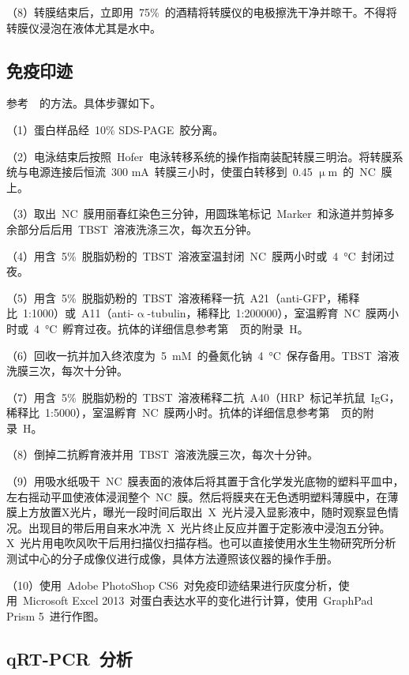 （8）转膜结束后，立即用\ 75\%\ 的酒精将转膜仪的电极擦洗干净并晾干。不得将转膜仪浸泡在液体尤其是水中。

\subsection{免疫印迹}\label{subsec:western}
参考\ \citet{Hu2014}\ 的方法。具体步骤如下。

（1）蛋白样品经\ 10\% SDS-PAGE\ 胶分离。

（2）电泳结束后按照\ Hofer\ 电泳转移系统的操作指南装配转膜三明治。将转膜系统与电源连接后恒流\ 300 mA\ 转膜三小时，使蛋白转移到\ 0.45 $\upmu$m\ 的\ NC\ 膜上。

（3）取出\ NC\ 膜用丽春红染色三分钟，用圆珠笔标记\ Marker\ 和泳道并剪掉多余部分后后用\ TBST\ 溶液洗涤三次，每次五分钟。

（4）用含\ 5\%\ 脱脂奶粉的\ TBST\ 溶液室温封闭\ NC\ 膜两小时或\ \SI{4}{\degreeCelsius}\ 封闭过夜。

（5）用含\ 5\%\ 脱脂奶粉的\ TBST\ 溶液稀释一抗\ A21（anti-GFP，稀释比\ 1:1000）或\ A11（anti-$\upalpha$-tubulin，稀释比\ 1:200000），室温孵育\ NC\ 膜两小时或\ \SI{4}{\degreeCelsius}\ 孵育过夜。抗体的详细信息参考第\
\pageref{appen:H}\ 页的附录\ H。

（6）回收一抗并加入终浓度为\ \SI{5}{\milli\nauticalmile}\ 的叠氮化钠\ \SI{4}{\degreeCelsius}\ 保存备用。TBST\ 溶液洗膜三次，每次十分钟。

（7）用含\ 5\%\ 脱脂奶粉的\ TBST\ 溶液稀释二抗\ A40（HRP\ 标记羊抗鼠\ IgG，稀释比\ 1:5000），室温孵育\ NC\ 膜两小时。抗体的详细信息参考第\ \pageref{appen:H}\ 页的附录\ H。

（8）倒掉二抗孵育液并用\ TBST\ 溶液洗膜三次，每次十分钟。

（9）用吸水纸吸干\ NC\ 膜表面的液体后将其置于含化学发光底物的塑料平皿中，左右摇动平皿使液体浸润整个\ NC\ 膜。然后将膜夹在无色透明塑料薄膜中，在薄膜上方放置X光片，曝光一段时间后取出\ X\ 光片浸入显影液中，随时观察显色情况。出现目的带后用自来水冲洗\ X\ 光片终止反应并置于定影液中浸泡五分钟。X\ 光片用电吹风吹干后用扫描仪扫描存档。也可以直接使用水生生物研究所分析测试中心的分子成像仪进行成像，具体方法遵照该仪器的操作手册。

（10）使用\ Adobe PhotoShop CS6\ 对免疫印迹结果进行灰度分析，使用\ Microsoft Excel 2013\ 对蛋白表达水平的变化进行计算，使用\ GraphPad Prism 5\ 进行作图。

\subsection{qRT-PCR\ 分析}
